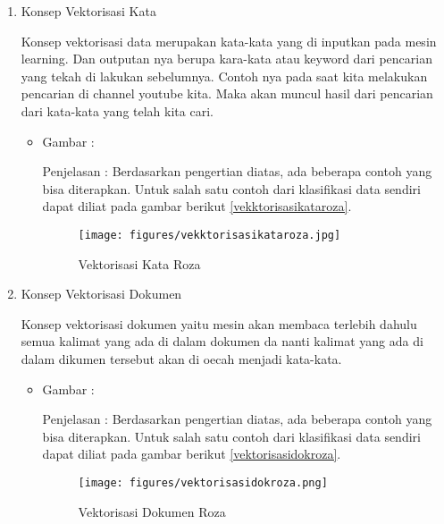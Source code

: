 \begin{enumerate}
\item Konsep Vektorisasi Kata 
\par Konsep vektorisasi data merupakan kata-kata yang di inputkan pada mesin learning. Dan outputan nya berupa kara-kata atau keyword dari pencarian yang tekah di lakukan sebelumnya. Contoh nya pada saat kita melakukan pencarian di channel youtube kita. Maka akan muncul hasil dari pencarian dari kata-kata yang telah kita cari.
\par
\begin{itemize}
\item Gambar :
\par Penjelasan : Berdasarkan pengertian diatas, ada beberapa contoh yang bisa diterapkan. Untuk salah satu contoh dari klasifikasi data sendiri dapat diliat pada gambar berikut \ref{vekktorisasikataroza}.
\begin{figure}[!hbtp]
\centering
\texttt{[image: figures/vekktorisasikataroza.jpg]}
\caption{Vektorisasi Kata Roza}
\label{text-fadila}
\end{figure}
\end{itemize}

\item Konsep Vektorisasi Dokumen 
\par Konsep vektorisasi dokumen yaitu mesin akan membaca terlebih dahulu semua kalimat yang ada di dalam dokumen da nanti kalimat yang ada di dalam dikumen tersebut akan di oecah menjadi kata-kata.
\par
\begin{itemize}
\item Gambar :
\par Penjelasan : Berdasarkan pengertian diatas, ada beberapa contoh yang bisa diterapkan. Untuk salah satu contoh dari klasifikasi data sendiri dapat diliat pada gambar berikut \ref{vektorisasidokroza}.
\begin{figure}[!hbtp]
\centering
\texttt{[image: figures/vektorisasidokroza.png]}
\caption{Vektorisasi Dokumen Roza}
\label{text-fadila}
\end{figure}
\end{itemize}


\end{enumerate}
